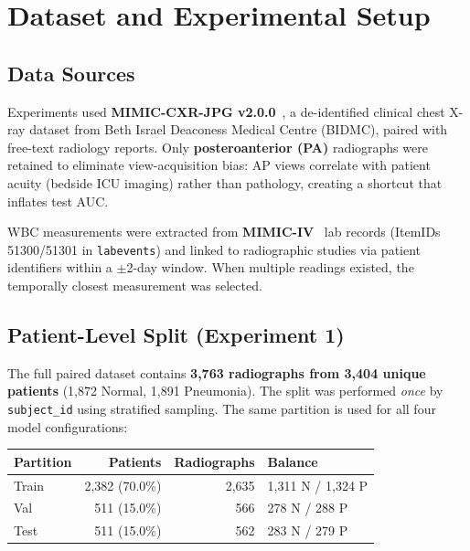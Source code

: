 \documentclass[conference]{IEEEtran}
\begin{document}
\section{\textcolor{aideep}{Dataset and Experimental Setup}}

\subsection{Data Sources}

Experiments used \textbf{MIMIC-CXR-JPG v2.0.0}~\cite{johnson2019mimic}, a de-identified clinical chest X-ray dataset from Beth Israel Deaconess Medical Centre (BIDMC), paired with free-text radiology reports. Only \textbf{posteroanterior (PA)} radiographs were retained to eliminate view-acquisition bias: AP views correlate with patient acuity (bedside ICU imaging) rather than pathology, creating a shortcut that inflates test AUC.

WBC measurements were extracted from \textbf{MIMIC-IV}~\cite{johnson2023mimiciv} lab records (ItemIDs 51300/51301 in \texttt{labevents}) and linked to radiographic studies via patient identifiers within a $\pm$2-day window. When multiple readings existed, the temporally closest measurement was selected.

\subsection{Patient-Level Split (Experiment 1)}

The full paired dataset contains \textbf{3,763 radiographs from 3,404 unique patients} (1,872 Normal, 1,891 Pneumonia). The split was performed \emph{once} by \texttt{subject\_id} using stratified sampling. The same partition is used for all four model configurations:

\begin{center}
\small
\begin{tabular}{lrrl}
\toprule
Partition & Patients & Radiographs & Balance \\
\midrule
Train & 2,382 (70.0\%) & 2,635 & 1,311 N / 1,324 P \\
Val   &   511 (15.0\%) &   566 &   278 N / 288 P \\
Test  &   511 (15.0\%) &   562 &   283 N / 279 P \\
\bottomrule
\end{tabular}
\end{center}
\end{document}
